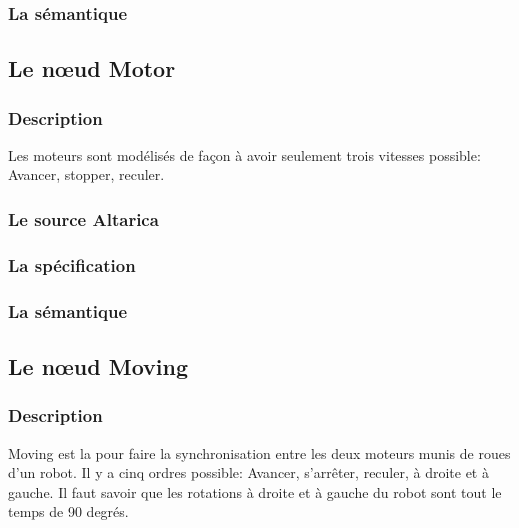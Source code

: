    \subsubsection{La sémantique}

  \subsection{Le n\oe{}ud Motor}
  
   \subsubsection{Description}
   Les moteurs sont modélisés de façon à avoir seulement trois vitesses
   possible: Avancer, stopper, reculer.

   \subsubsection{Le source Altarica}
   
   
   \subsubsection{La spécification}
   
   
   \subsubsection{La sémantique}

  \subsection{Le n\oe{}ud Moving}

   \subsubsection{Description}
   Moving est la pour faire la synchronisation entre les deux moteurs
   munis de roues d'un robot. Il y a cinq ordres possible: Avancer,
   s'arrêter, reculer, à droite et à gauche. Il faut savoir que les
   rotations à droite et à gauche du robot sont tout le temps de 90
   degrés.

